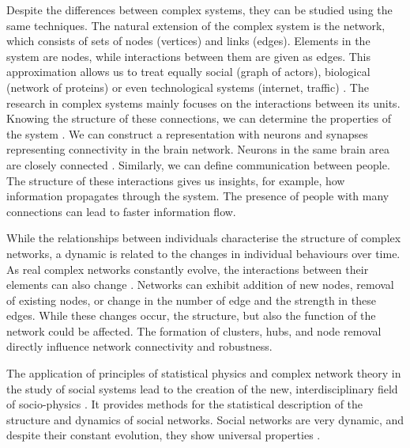 Despite the differences between complex systems, they can be studied using the same techniques. The natural extension of the complex system is the network, which consists of sets of nodes (vertices) and links (edges). Elements in the system are nodes, while interactions between them are given as edges. This approximation allows us to treat equally social \cite{myers2014, sarigol2014} (graph of actors), biological (network of proteins) \cite{fraiman2009ising, schneider2011modeling} or even technological systems (internet, traffic) \cite{costa2007characterization, costa2011analyzing, newman2003structure}. The research in complex systems mainly focuses on the interactions between its units. Knowing the %
structure of these connections, we can determine the properties of the system \cite{ladyman2013}. We can construct a representation with neurons and synapses representing connectivity in the brain network. Neurons in the same brain area are closely connected \cite{latora2017complex}. Similarly, we can define communication between people. The structure of these interactions gives us insights, for example, how information propagates through the system. The presence of people with many connections can lead to faster information flow. 

While the relationships between individuals characterise the structure of complex networks, a dynamic is related to the changes in individual behaviours over time. As real complex networks constantly evolve, the interactions between their elements can also change \cite{thurner2018}. Networks can exhibit addition of new nodes, removal of existing nodes, or change in the number of edge and the strength in these edges.
While these changes occur, the structure, but also the function of the network could be affected. The formation of clusters, hubs, and node removal directly influence network connectivity and robustness. %

The application of principles of statistical physics and complex network theory in the study of social systems lead to the creation of the new, interdisciplinary field of socio-physics \cite{sen2014sociophysics}. It provides methods for the statistical description of the structure and dynamics of social networks. Social networks are very dynamic, and despite their constant evolution, they show universal properties \cite{schweitzer2018sociophysics}.

